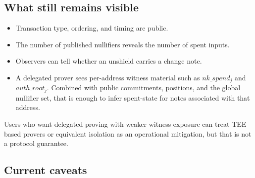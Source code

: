 \documentclass[11pt]{article}
\begin{document}
\subsection{What still remains visible}

\begin{itemize}
  \item Transaction type, ordering, and timing are public.
  \item The number of published nullifiers reveals the number of spent inputs.
  \item Observers can tell whether an unshield carries a change note.
  \item A delegated prover sees per-address witness material such as
        \(nk\_spend_j\) and \(auth\_root_j\). Combined with public commitments,
        positions, and the global nullifier set, that is enough to infer
        spent-state for notes associated with that address.
\end{itemize}

Users who want delegated proving with weaker witness exposure can treat TEE-based
provers or equivalent isolation as an operational mitigation, but that is not a
protocol guarantee.

\subsection{Current caveats}
\end{document}
